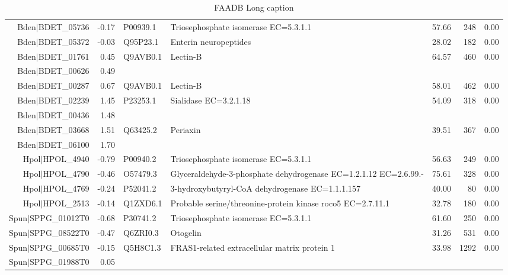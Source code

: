 \begin{table}[hp]
\begin{tabular}{rrllrrr}
  Bden$|$BDET\_05736 & -0.17 & P00939.1 & Triosephosphate isomerase EC=5.3.1.1 & 57.66 & 248 & 0.00 \\ 
  Bden$|$BDET\_05372 & -0.03 & Q95P23.1 & Enterin neuropeptides & 28.02 & 182 & 0.00 \\ 
  Bden$|$BDET\_01761 & 0.45 & Q9AVB0.1 & Lectin-B & 64.57 & 460 & 0.00 \\ 
  Bden$|$BDET\_00626 & 0.49 &  &  &  &  &  \\ 
  Bden$|$BDET\_00287 & 0.67 & Q9AVB0.1 & Lectin-B & 58.01 & 462 & 0.00 \\ 
  Bden$|$BDET\_02239 & 1.45 & P23253.1 & Sialidase EC=3.2.1.18 & 54.09 & 318 & 0.00 \\ 
  Bden$|$BDET\_00436 & 1.48 &  &  &  &  &  \\ 
  Bden$|$BDET\_03668 & 1.51 & Q63425.2 & Periaxin & 39.51 & 367 & 0.00 \\ 
  Bden$|$BDET\_06100 & 1.70 &  &  &  &  &  \\ 
  Hpol$|$HPOL\_4940 & -0.79 & P00940.2 & Triosephosphate isomerase EC=5.3.1.1 & 56.63 & 249 & 0.00 \\ 
  Hpol$|$HPOL\_4790 & -0.46 & O57479.3 & Glyceraldehyde-3-phosphate dehydrogenase EC=1.2.1.12 EC=2.6.99.- & 75.61 & 328 & 0.00 \\ 
  Hpol$|$HPOL\_4769 & -0.24 & P52041.2 & 3-hydroxybutyryl-CoA dehydrogenase EC=1.1.1.157 & 40.00 &  80 & 0.00 \\ 
  Hpol$|$HPOL\_2513 & -0.14 & Q1ZXD6.1 & Probable serine/threonine-protein kinase roco5 EC=2.7.11.1 & 32.78 & 180 & 0.00 \\ 
  Spun$|$SPPG\_01012T0 & -0.68 & P30741.2 & Triosephosphate isomerase EC=5.3.1.1 & 61.60 & 250 & 0.00 \\ 
  Spun$|$SPPG\_08522T0 & -0.47 & Q6ZRI0.3 & Otogelin & 31.26 & 531 & 0.00 \\ 
  Spun$|$SPPG\_00685T0 & -0.15 & Q5H8C1.3 & FRAS1-related extracellular matrix protein 1 & 33.98 & 1292 & 0.00 \\ 
  Spun$|$SPPG\_01988T0 & 0.05 &  &  &  &  &  \\ 
   \hline
\hline
\end{tabular}
\caption[FAADB short caption]{FAADB Long caption} 
\label{tab:ChClat_FAADB}
\end{table}
